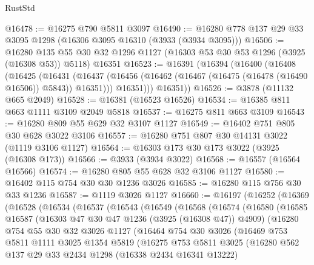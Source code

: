\begin{lexlean}{RustStd}
\begin{coremodule}
@16478 := @16275 @790 @5811 @3097
@16490 := @16280 @778 @137 @29 @33 @3095 @1298 (@16306 @3095 @16310 (@3933 (@3934 @3095)))
@16506 := @16280
    @135
    @55
    @30
    @32
    @1296
    @1127
    (@16303 @53 @30 @53 @1296 (@3925 (@16308 @53)) @5118)
    @16351
@16523 := @16391
    (@16394
      (@16400
        (@16408
          (@16425
            (@16431
              (@16437 (@16456 (@16462 (@16467 (@16475 (@16478 (@16490 @16506)) @5843)) @16351)))
              @16351)))
        @16351))
@16526 := @3878 (@11132 @665 @2049)
@16528 := @16381 (@16523 @16526)
@16534 := @16385 @811 @663 @1111 @3109 @2049 @5818
@16537 := @16275 @811 @663 @3109
@16543 := @16280 @809 @55 @629 @32 @3107 @1127
@16549 := @16402 @751 @805 @30 @628 @3022 @3106
@16557 := @16280 @751 @807 @30 @14131 @3022 (@1119 @3106 @1127)
@16564 := @16303 @173 @30 @173 @3022 (@3925 (@16308 @173))
@16566 := @3933 (@3934 @3022)
@16568 := @16557 (@16564 @16566)
@16574 := @16280 @805 @55 @628 @32 @3106 @1127
@16580 := @16402 @115 @754 @30 @30 @1236 @3026
@16585 := @16280 @115 @756 @30 @33 @1236
@16587 := @1119 @3026 @1127
@16660 := @16197
    (@16252
      (@16369
        (@16528
          (@16534
            (@16537
              (@16543
                (@16549
                  (@16568
                    (@16574
                      (@16580
                        (@16585
                          @16587
                          (@16303 @47 @30 @47 @1236 (@3925 (@16308 @47)) @4909)
                          (@16280
                            @754
                            @55
                            @30
                            @32
                            @3026
                            @1127
                            (@16464
                              @754
                              @30
                              @3026
                              (@16469
                                @753
                                @5811
                                @1111
                                @3025
                                @1354
                                @5819
                                (@16275
                                  @753
                                  @5811
                                  @3025
                                  (@16280
                                    @562
                                    @137
                                    @29
                                    @33
                                    @2434
                                    @1298
                                    (@16338 @2434 @16341 @13222)

\end{coremodule}
\end{lexlean}
